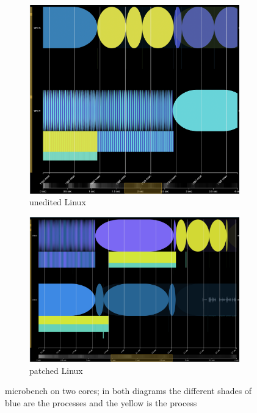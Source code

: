 \begin{figure}[t]
    \centering
    \begin{subfigure}[t]{0.49\columnwidth}
        \includegraphics[width=\columnwidth]{graphs/schedviz-steal-unedited.png}
        \caption{unedited Linux}
    \end{subfigure}
    \hspace{\fill}
    \begin{subfigure}[t]{0.49\columnwidth}
        \includegraphics[width=\columnwidth]{graphs/schedviz-steal-patched.png}
        \caption{patched Linux}
    \end{subfigure}
    \vspace{4pt}
    \caption{microbench on two cores; in both diagrams the different shades of blue are the
    \schednormal{} processes and the yellow is the \schedidle{} process}\label{fig:steal-micro}
\end{figure}

